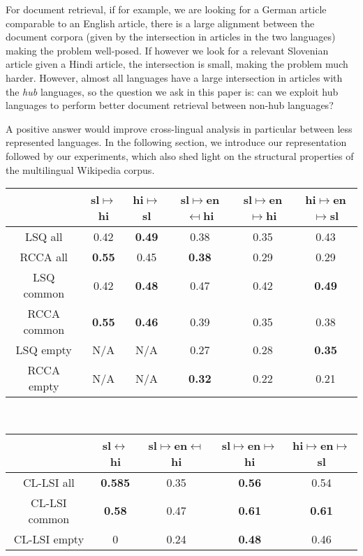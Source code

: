 \documentclass[twocolumn, draft]{article}
\begin{document}
For document retrieval, if for example, we are looking for a
German article comparable to an English article, there is a large
alignment between the document corpora (given by the intersection
in articles in the two languages) making the problem
well-posed. If however we look for a relevant
Slovenian article given a Hindi article, the intersection is small,
making the problem much harder.
However, almost all languages have a large intersection in
articles with the \emph{hub} languages, so the question we ask in
this paper is: can we exploit hub languages to perform better
document retrieval between non-hub languages?

A positive answer would  improve cross-lingual analysis in
particular between less represented languages. In the following
section, we introduce our representation followed by our
experiments, which also shed light on the structural properties
of the multilingual Wikipedia corpus.


\begin{table*}[t]
\begin{center}
\caption{Slovenian-Hindi MAPR retrieval using different maps}
\label{regress_lsq}
{
\begin{tabular}{|c|c|c|c|c|c|}\hline &sl$\mapsto${\bf hi}& hi$\mapsto${\bf sl}& sl$\mapsto${\bf en}$\mapsfrom$hi &sl$\mapsto$en$\mapsto${\bf hi} &   hi$\mapsto$en$\mapsto${\bf sl}\\\hline
                  LSQ all     &0.42 & {\bf 0.49} & 0.38 & 0.35 & 0.43\\\hline
                  RCCA all    &{\bf 0.55} & 0.45 & {\bf 0.38} & 0.29 & 0.29\\\hline
                  LSQ common     &0.42 & {\bf 0.48} & 0.47 & 0.42 & {\bf 0.49}\\\hline
                  RCCA common     &{\bf 0.55} & {\bf 0.46} & 0.39 & 0.35 & 0.38\\\hline
                  LSQ empty     &  N/A   & N/A     & 0.27 & 0.28 & {\bf 0.35}\\\hline
                  RCCA empty     &  N/A   & N/A     & {\bf 0.32} & 0.22 & 0.21\\\hline
\end{tabular}\\
\vspace{0.1cm}
\begin{tabular}{|c|c|c|c|c|}\hline
&{\bf sl}$\leftrightarrow${\bf hi} & sl$\mapsto${\bf en}$\mapsfrom$ hi & sl$\mapsto$en$\mapsto${\bf hi} &   hi$\mapsto$en$\mapsto${\bf sl}\\\hline
CL-LSI all&{\bf 0.585} & 0.35 & {\bf 0.56} & 0.54\\\hline
CL-LSI common&{\bf 0.58} & 0.47 & {\bf 0.61} & {\bf 0.61}\\\hline
CL-LSI empty &0 & 0.24 & {\bf 0.48} & 0.46 \\\hline
\end{tabular}
}
\end{center}
\end{table*}
\vspace{-0.2cm}
\end{document}
